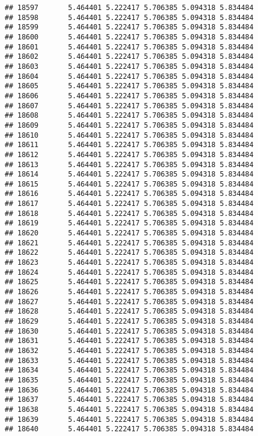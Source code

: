\documentclass[
]{article}
\begin{document}
\begin{verbatim}
## 18597       5.464401 5.222417 5.706385 5.094318 5.834484
## 18598       5.464401 5.222417 5.706385 5.094318 5.834484
## 18599       5.464401 5.222417 5.706385 5.094318 5.834484
## 18600       5.464401 5.222417 5.706385 5.094318 5.834484
## 18601       5.464401 5.222417 5.706385 5.094318 5.834484
## 18602       5.464401 5.222417 5.706385 5.094318 5.834484
## 18603       5.464401 5.222417 5.706385 5.094318 5.834484
## 18604       5.464401 5.222417 5.706385 5.094318 5.834484
## 18605       5.464401 5.222417 5.706385 5.094318 5.834484
## 18606       5.464401 5.222417 5.706385 5.094318 5.834484
## 18607       5.464401 5.222417 5.706385 5.094318 5.834484
## 18608       5.464401 5.222417 5.706385 5.094318 5.834484
## 18609       5.464401 5.222417 5.706385 5.094318 5.834484
## 18610       5.464401 5.222417 5.706385 5.094318 5.834484
## 18611       5.464401 5.222417 5.706385 5.094318 5.834484
## 18612       5.464401 5.222417 5.706385 5.094318 5.834484
## 18613       5.464401 5.222417 5.706385 5.094318 5.834484
## 18614       5.464401 5.222417 5.706385 5.094318 5.834484
## 18615       5.464401 5.222417 5.706385 5.094318 5.834484
## 18616       5.464401 5.222417 5.706385 5.094318 5.834484
## 18617       5.464401 5.222417 5.706385 5.094318 5.834484
## 18618       5.464401 5.222417 5.706385 5.094318 5.834484
## 18619       5.464401 5.222417 5.706385 5.094318 5.834484
## 18620       5.464401 5.222417 5.706385 5.094318 5.834484
## 18621       5.464401 5.222417 5.706385 5.094318 5.834484
## 18622       5.464401 5.222417 5.706385 5.094318 5.834484
## 18623       5.464401 5.222417 5.706385 5.094318 5.834484
## 18624       5.464401 5.222417 5.706385 5.094318 5.834484
## 18625       5.464401 5.222417 5.706385 5.094318 5.834484
## 18626       5.464401 5.222417 5.706385 5.094318 5.834484
## 18627       5.464401 5.222417 5.706385 5.094318 5.834484
## 18628       5.464401 5.222417 5.706385 5.094318 5.834484
## 18629       5.464401 5.222417 5.706385 5.094318 5.834484
## 18630       5.464401 5.222417 5.706385 5.094318 5.834484
## 18631       5.464401 5.222417 5.706385 5.094318 5.834484
## 18632       5.464401 5.222417 5.706385 5.094318 5.834484
## 18633       5.464401 5.222417 5.706385 5.094318 5.834484
## 18634       5.464401 5.222417 5.706385 5.094318 5.834484
## 18635       5.464401 5.222417 5.706385 5.094318 5.834484
## 18636       5.464401 5.222417 5.706385 5.094318 5.834484
## 18637       5.464401 5.222417 5.706385 5.094318 5.834484
## 18638       5.464401 5.222417 5.706385 5.094318 5.834484
## 18639       5.464401 5.222417 5.706385 5.094318 5.834484
## 18640       5.464401 5.222417 5.706385 5.094318 5.834484

\end{verbatim}
\end{document}

